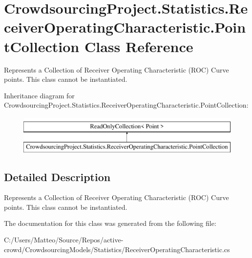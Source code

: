 \hypertarget{class_crowdsourcing_project_1_1_statistics_1_1_receiver_operating_characteristic_1_1_point_collection}{}\section{Crowdsourcing\+Project.\+Statistics.\+Receiver\+Operating\+Characteristic.\+Point\+Collection Class Reference}
\label{class_crowdsourcing_project_1_1_statistics_1_1_receiver_operating_characteristic_1_1_point_collection}


Represents a Collection of Receiver Operating Characteristic (R\+O\+C) Curve points. This class cannot be instantiated.  


Inheritance diagram for Crowdsourcing\+Project.\+Statistics.\+Receiver\+Operating\+Characteristic.\+Point\+Collection\+:\begin{figure}[H]
\begin{center}
\leavevmode
\includegraphics[height=2.000000cm]{class_crowdsourcing_project_1_1_statistics_1_1_receiver_operating_characteristic_1_1_point_collection}
\end{center}
\end{figure}


\subsection{Detailed Description}
Represents a Collection of Receiver Operating Characteristic (R\+O\+C) Curve points. This class cannot be instantiated. 



The documentation for this class was generated from the following file\+:\begin{DoxyCompactItemize}
\item 
C\+:/\+Users/\+Matteo/\+Source/\+Repos/active-\/crowd/\+Crowdsourcing\+Models/\+Statistics/Receiver\+Operating\+Characteristic.\+cs\end{DoxyCompactItemize}
